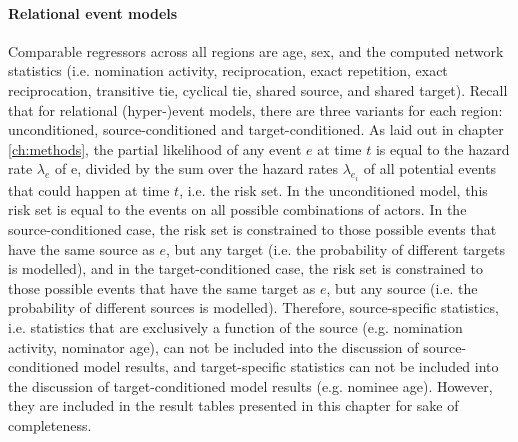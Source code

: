 \paragraph{Relational event models} Comparable regressors across all regions are age, sex, and the computed network statistics (i.e. nomination activity, reciprocation, exact repetition, exact reciprocation, transitive tie, cyclical tie, shared source, and shared target). Recall that for relational (hyper-)event models, there are three variants for each region: unconditioned, source-conditioned and target-conditioned. As laid out in chapter \ref{ch:methods}, the partial likelihood of any event $e$ at time $t$ is equal to the hazard rate $\lambda_e$ of e, divided by the sum over the hazard rates $\lambda_{e_i}$ of all potential events that could happen at time $t$, i.e. the risk set. In the unconditioned model, this risk set is equal to the events on all possible combinations of actors. In the source-conditioned case, the risk set is constrained to those possible events that have the same source as $e$, but any target (i.e. the probability of different targets is modelled), and in the target-conditioned case, the risk set is constrained to those possible events that have the same target as $e$, but any source (i.e. the probability of different sources is modelled). Therefore, source-specific statistics, i.e. statistics that are exclusively a function of the source (e.g. nomination activity, nominator age), can not be included into the discussion of source-conditioned model results, and target-specific statistics can not be included into the discussion of target-conditioned model results (e.g. nominee age). However, they are included in the result tables presented in this chapter for sake of completeness. 

